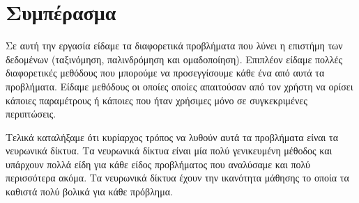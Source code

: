\newpage
\section{Συμπέρασμα}
Σε αυτή την εργασία είδαμε τα διαφορετικά προβλήματα που λύνει η επιστήμη των δεδομένων (ταξινόμηση, παλινδρόμηση και ομαδοποίηση). Επιπλέον είδαμε πολλές διαφορετικές μεθόδους που μπορούμε να προσεγγίσουμε κάθε ένα από αυτά τα προβλήματα.
Είδαμε μεθόδους οι οποίες οποίες απαιτούσαν από τον χρήστη να ορίσει κάποιες παραμέτρους ή κάποιες που ήταν χρήσιμες μόνο σε συγκεκριμένες περιπτώσεις.

Τελικά καταλήξαμε ότι κυρίαρχος τρόπος να λυθούν αυτά τα προβλήματα είναι τα νευρωνικά δίκτυα. Τα νευρωνικά δίκτυα είναι μία πολύ γενικευμένη μέθοδος και υπάρχουν πολλά είδη για κάθε είδος προβλήματος που αναλύσαμε και πολύ περισσότερα ακόμα. Τα νευρωνικά δίκτυα έχουν την ικανότητα μάθησης το οποία τα καθιστά πολύ βολικά για κάθε πρόβλημα.